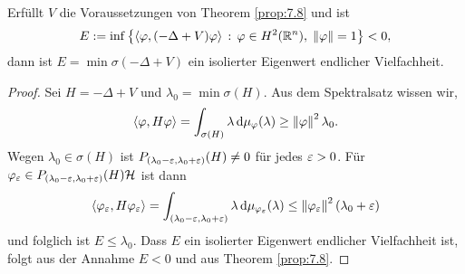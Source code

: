 \begin{cor}
\label{prop:7.9}
Erfüllt $V$ die Voraussetzungen von Theorem \ref{prop:7.8} und ist
\begin{align*}
E := \inf\left\{ \left\langle\varphi,(-\Delta+V)\varphi\right\rangle\,:\,\varphi\in H^2(\mathbb{R}^n),\; \left\|\varphi\right\| =
1\right\}<0,
\end{align*}
dann ist $E=\min\sigma(-\Delta+V)$ ein isolierter Eigenwert endlicher
Vielfachheit.\fishhere
\end{cor}
\begin{proof}
Sei $H=-\Delta + V$ und $\lambda_0 = \min \sigma(H)$. Aus dem Spektralsatz
wissen wir,
\begin{align*}
\left\langle\varphi,H\varphi\right\rangle = \int_{\sigma(H)} \lambda\,\mathrm{d} \mu_{\varphi}(\lambda)
\ge \left\|\varphi\right\|^2\lambda_0.
\end{align*}
Wegen $\lambda_0\in \sigma(H)$  ist 
$P_{(\lambda_0-\varepsilon,\lambda_0+\varepsilon)}(H)\neq 0$
für jedes $\varepsilon > 0$. Für $\varphi_\varepsilon \in
P_{(\lambda_0-\varepsilon,\lambda_0+\varepsilon)}(H)\mathcal{H}$ ist dann
\begin{align*}
\left\langle\varphi_\varepsilon,H\varphi_\varepsilon\right\rangle = \int_{(\lambda_0-\varepsilon,\lambda_0+\varepsilon)} \lambda
\,\mathrm{d} \mu_{\varphi_\varepsilon}(\lambda) \le \left\|\varphi_\varepsilon\right\|^2\left(\lambda_0 + \varepsilon\right)
\end{align*}
und folglich ist $E\le \lambda_0$.
Dass $E$ ein isolierter Eigenwert endlicher Vielfachheit ist, folgt aus der
Annahme $E< 0$ und aus Theorem \ref{prop:7.8}.\qedhere
\end{proof}
% 
% 
